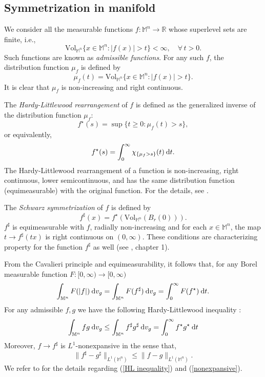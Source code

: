 \documentclass[a4paper,11pt,reqno]{amsart}
\renewcommand\eqref[1]{(\ref{#1})}
\theoremstyle{plain}
\numberwithin{equation}{section} \allowdisplaybreaks
\newcommand{\dvg}{\: {\rm d}v_{g}}
\newcommand{\m}{\mathbb{M}^n}
\newcommand{\dt}{\:{\rm d}t}
\begin{document}
\subsection{Symmetrization in manifold}
We consider all the measurable functions $f:\m\to\mathbb{R}$ whose superlevel sets are finite, i.e.,
\begin{equation*}
    \text{Vol}_{\m}\{x\in \m: |f(x)|>t\}<\infty,\quad \forall\, t>0.
\end{equation*}
Such functions are known as \textit{admissible functions}. For any such $f$, the distribution function $\mu_f$ is defined by
\begin{equation*}
    \mu_f(t)=\text{Vol}_{\m}\{x\in \m: |f(x)|>t\}.
\end{equation*}
It is clear that $\mu_f$ is non-increasing and right continuous. 

The \textit{Hardy-Littlewood rearrangement} of $f$ is defined as the generalized inverse of the distribution function $\mu_f$:
\begin{equation*}
    f^\star(s)=\sup\{t\geq0: \mu_f(t) > s\},
\end{equation*}
or equivalently,
\begin{equation*}
    f^\star(s)=\int_0^{\infty} \chi_{\{\mu_f>s\}}(t)\dt.
\end{equation*}
The Hardy-Littlewood rearrangement of a function is non-increasing, right continuous, lower semicontinuous, and has the same distribution function (equimeasurable) with the original function. For the details, see \cite{bnstn}. 

The \textit{Schwarz symmetrization} of $f$ is defined by
\begin{equation}\label{centered symmetrization}
    f^\sharp(x)= f^\star(\text{Vol}_{\m}(B_r(0))).
\end{equation}
$f^\sharp$ is equimeasurable with $f$, radially non-increasing and for each $x\in \m$, the map $t \to f^\sharp (tx)$ is right continuous on $(0,\infty)$. These conditions are characterizing property for the function $f^\sharp$ as well (see \cite{bnstn}, chapter 1).

From the Cavalieri principle and equimeasurability, it follows that, for any Borel measurable function $F: [0,\infty)\to[0,\infty)$
\begin{equation*}
\int_{\m}F(|f|)\dvg=\int_{\m}F(f^\sharp)\dvg=\int_0^{\infty}F(f^\star)\dt.
\end{equation*}
For any admissible $f,g$ we have the following Hardy-Littlewood inequality :
\begin{equation}\label{HL inequality}
    \int_{\m}fg\dvg\leq\int_{\m}f^\sharp g^\sharp\dvg=\int_0^{\infty}f^\star g^\star\dt
\end{equation}
Moreover, $f\to f^\sharp$ is $L^1$-nonexpansive in the sense that,
\begin{equation}\label{nonexpansive}
    \|f^\sharp-g^\sharp\|_{L^1(\m)}\leq \|f-g\|_{L^1(\m)}.
\end{equation}
We refer to \cite{BS} for the details regarding \eqref{HL inequality} and \eqref{nonexpansive}.
\end{document}
